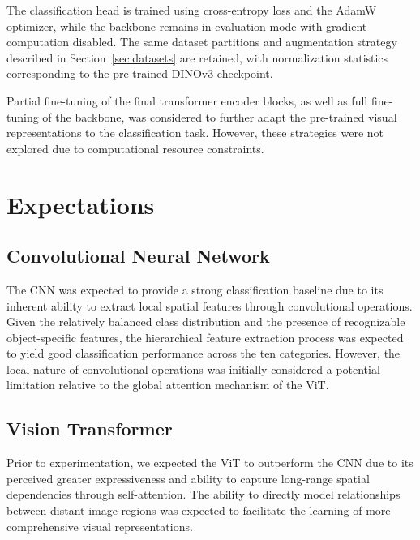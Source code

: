 \documentclass[conference]{IEEEtran}
\begin{document}
The classification head is trained using cross-entropy
loss and the AdamW optimizer, while the backbone remains
in evaluation mode with gradient computation disabled.
The same dataset partitions and augmentation strategy
described in Section~\ref{sec:datasets} are retained,
with normalization statistics corresponding to the
pre-trained DINOv3 checkpoint.

Partial fine-tuning of the final transformer encoder
blocks, as well as full fine-tuning of the backbone,
was considered to further adapt the pre-trained visual
representations to the classification task. However,
these strategies were not explored due to computational
resource constraints.



\section{Expectations}
\label{sec:expectations}

\subsection{Convolutional Neural Network}

The CNN was expected to provide a strong classification
baseline due to its inherent ability to extract local
spatial features through convolutional operations.
Given the relatively balanced class distribution and
the presence of recognizable object-specific features,
the hierarchical feature extraction process was expected
to yield good classification performance across the ten
categories. However, the local nature of convolutional
operations was initially considered a potential limitation
relative to the global attention mechanism of the ViT.

\subsection{Vision Transformer}

Prior to experimentation, we expected the ViT to
outperform the CNN due to its perceived greater
expressiveness and ability to capture long-range spatial
dependencies through self-attention. The ability to
directly model relationships between distant image
regions was expected to facilitate the learning of more
comprehensive visual representations.
\end{document}
